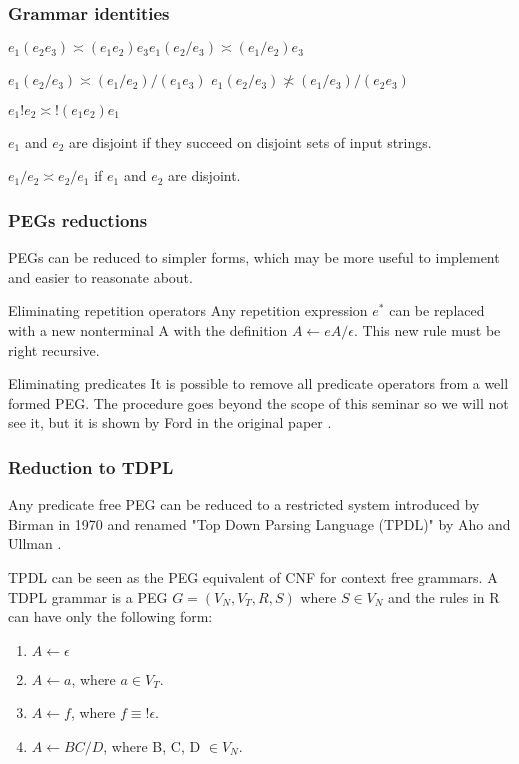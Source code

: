 \begin{frame}
\frametitle{Grammar identities}
	
	$e_1(e_2e_3) \asymp (e_1e_2)e_3$\hfill $e_1(e_2 / e_3) \asymp (e_1 / e_2)e_3$
		
		
		
		$e_1(e_2 / e_3) \asymp (e_1/ e_2) / (e_1e_3)$  	\hfill $e_1(e_2 / e_3) \not\asymp (e_1/ e_3) / (e_2e_3)$
		
	

		
	$ e_1!e_2 \asymp   !(e_1e_2)e_1$ \hfill
	
	  $e_1$ and $e_2$ are disjoint if they succeed on disjoint sets of input strings.
	
	$e_1 / e_2 \asymp  e_2 / e_1$ if  $e_1$ and $e_2$ are disjoint.
	

	
\end{frame}

\begin{frame}
	\frametitle{PEGs reductions}
	PEGs can be reduced to simpler forms, which may be more useful to implement and easier to reasonate about.
	
	\begin{block}{Eliminating repetition operators}
		Any repetition expression $e^*$ can be  replaced with a new  nonterminal A  with the definition $A \leftarrow eA / \epsilon$. This new rule must be right recursive.
	\end{block} 
	\begin{block}{Eliminating predicates}
		It is possible to remove all predicate operators from a well formed PEG. The procedure goes beyond the scope of this seminar so we will not see it, but it is shown by Ford in the original paper \cite{peg}.
	\end{block}
\end{frame}

\begin{frame}
\frametitle{Reduction to TDPL }
Any predicate free PEG can be reduced  to a restricted system introduced by Birman in 1970 \cite{birman1970tmg} and renamed "Top Down Parsing Language (TPDL)" by Aho and Ullman \cite{10.5555/578789}.

\begin{block}{}
	TPDL can be seen as the PEG equivalent of CNF for context free grammars.  A TDPL grammar is  a PEG $G=(V_N,V_T,R,S)$ where  $S \in V_N$ and the rules in R can have only the following form:
	\begin{enumerate}
		\item $A \leftarrow \epsilon$
		\item $A \leftarrow a$, where $a \in V_T$.
		\item $A \leftarrow f$, where $f \equiv !\epsilon$.
		\item $A \leftarrow BC / D$, where B, C, D $\in V_N$.
	\end{enumerate}
\end{block}
\end{frame}

